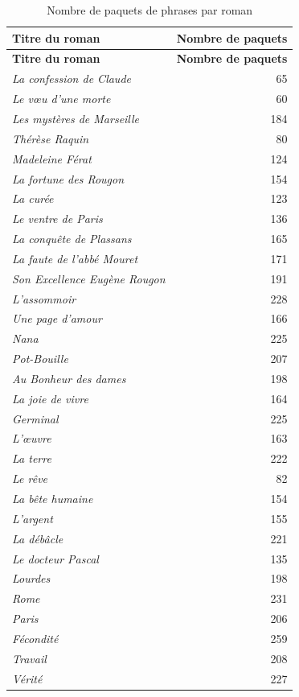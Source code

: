 \begin{longtable}{p{8cm}r}
\caption{Nombre de paquets de phrases par roman} \\
\toprule
\textbf{Titre du roman} & \textbf{Nombre de paquets} \\
\midrule
\endfirsthead

\toprule
\textbf{Titre du roman} & \textbf{Nombre de paquets} \\
\midrule
\endhead

\textit{La confession de Claude} & 65 \\
\textit{Le vœu d'une morte} & 60 \\
\textit{Les mystères de Marseille} & 184 \\
\textit{Thérèse Raquin} & 80 \\
\textit{Madeleine Férat} & 124 \\
\textit{La fortune des Rougon} & 154 \\
\textit{La curée} & 123 \\
\textit{Le ventre de Paris} & 136 \\
\textit{La conquête de Plassans} & 165 \\
\textit{La faute de l'abbé Mouret} & 171 \\
\textit{Son Excellence Eugène Rougon} & 191 \\
\textit{L'assommoir} & 228 \\
\textit{Une page d'amour} & 166 \\
\textit{Nana} & 225 \\
\textit{Pot-Bouille} & 207 \\
\textit{Au Bonheur des dames} & 198 \\
\textit{La joie de vivre} & 164 \\
\textit{Germinal} & 225 \\
\textit{L'œuvre} & 163 \\
\textit{La terre} & 222 \\
\textit{Le rêve} & 82 \\
\textit{La bête humaine} & 154 \\
\textit{L'argent} & 155 \\
\textit{La débâcle} & 221 \\
\textit{Le docteur Pascal} & 135 \\
\textit{Lourdes} & 198 \\
\textit{Rome} & 231 \\
\textit{Paris} & 206 \\
\textit{Fécondité} & 259 \\
\textit{Travail} & 208 \\
\textit{Vérité} & 227 \\

\bottomrule
\end{longtable}

